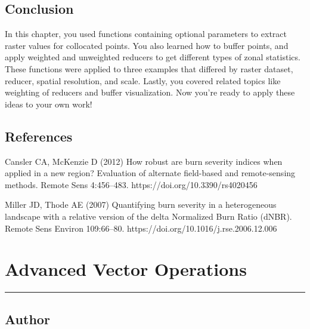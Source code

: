 \documentclass[
  letterpaper,
  DIV=11,
  numbers=noendperiod]{scrreprt}
\begin{document}
\hypertarget{conclusion-19}{%
\section*{Conclusion}\label{conclusion-19}}


In this chapter, you used functions containing optional parameters to
extract raster values for collocated points. You also learned how to
buffer points, and apply weighted and unweighted reducers to get
different types of zonal statistics. These functions were applied to
three examples that differed by raster dataset, reducer, spatial
resolution, and scale. Lastly, you covered related topics like weighting
of reducers and buffer visualization. Now you're ready to apply these
ideas to your own work!

\hypertarget{references-13}{%
\section*{References}\label{references-13}}


Cansler CA, McKenzie D (2012) How robust are burn severity indices when
applied in a new region? Evaluation of alternate field-based and
remote-sensing methods. Remote Sens 4:456--483.
https://doi.org/10.3390/rs4020456

Miller JD, Thode AE (2007) Quantifying burn severity in a heterogeneous
landscape with a relative version of the delta Normalized Burn Ratio
(dNBR). Remote Sens Environ 109:66--80.
https://doi.org/10.1016/j.rse.2006.12.006

\hypertarget{advanced-vector-operations}{%
\chapter{Advanced Vector Operations}\label{advanced-vector-operations}}

\begin{center}\rule{0.5\linewidth}{0.5pt}\end{center}

\hypertarget{author-18}{%
\section*{Author}\label{author-18}}

\end{document}
